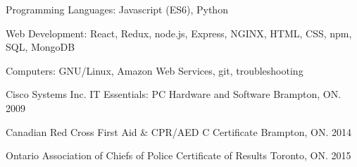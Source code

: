 

\begin{cvhonors}

  \cvhonor
    {Programming Languages:} %
    {Javascript (ES6), Python} %
    {} %
    {} %

  \cvhonor
    {Web Development:} %
    {React, Redux, node.js, Express, NGINX, HTML, CSS, npm, SQL, MongoDB} %
    {} %
    {} %

  \cvhonor
    {Computers:} %
    {GNU/Linux, Amazon Web Services, git, troubleshooting} %
    {} %
    {} %

  \cvhonor
    {Cisco Systems Inc.} %
    {IT Essentials: PC Hardware and Software} %
    {Brampton, ON.} %
    {2009} %

  \cvhonor
    {Canadian Red Cross} %
    {First Aid \& CPR/AED C Certificate} %
    {Brampton, ON.} %
    {2014} %

  \cvhonor
    {Ontario Association of Chiefs of Police} %
    {Certificate of Results} %
    {Toronto, ON.} %
    {2015} %

\end{cvhonors}